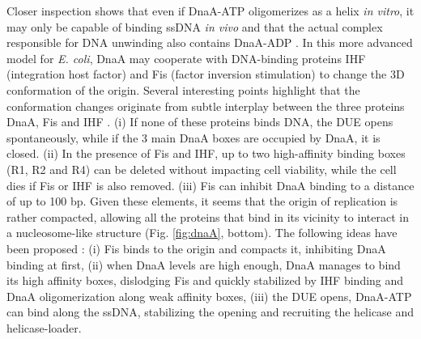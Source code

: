 Closer inspection shows that even if DnaA-ATP oligomerizes as a helix \textit{in vitro}, it may only be capable of binding ssDNA \textit{in vivo} and that the actual complex responsible for DNA unwinding also contains DnaA-ADP \citep{leonard_regulation_2011}. In this more advanced model for \textit{E. coli}, DnaA may cooperate with DNA-binding proteins IHF (integration host factor) and Fis (factor inversion stimulation) to change the 3D conformation of the origin. Several interesting points highlight that the conformation changes originate from subtle interplay between the three proteins DnaA, Fis and IHF \citep{kaur_building_2014}. (i) If none of these proteins binds DNA, the DUE opens spontaneously, while if the 3 main DnaA boxes are occupied by DnaA, it is closed. (ii) In the presence of Fis and IHF, up to two high-affinity binding boxes (R1, R2 and R4) can be deleted without impacting cell viability, while the cell dies if Fis or IHF is also removed. (iii) Fis can inhibit DnaA binding to a distance of up to 100 bp. Given these elements, it seems that the origin of replication is rather compacted, allowing all the proteins that bind in its vicinity to interact in a nucleosome-like structure (Fig. \ref{fig:dnaA}, bottom). The following ideas have been proposed \citep{leonard_regulation_2011,kaur_building_2014}: (i) Fis binds to the origin and compacts it, inhibiting DnaA binding at first, (ii) when DnaA levels are high enough, DnaA manages to bind its high affinity boxes, dislodging Fis and quickly stabilized by IHF binding and DnaA oligomerization along weak affinity boxes, (iii) the DUE opens, DnaA-ATP can bind along the ssDNA, stabilizing the opening and recruiting the helicase and helicase-loader.

